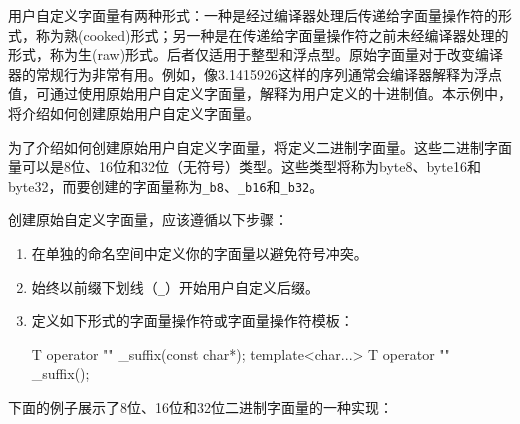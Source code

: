 

用户自定义字面量有两种形式：一种是经过编译器处理后传递给字面量操作符的形式，称为熟(cooked)形式；另一种是在传递给字面量操作符之前未经编译器处理的形式，称为生(raw)形式。后者仅适用于整型和浮点型。原始字面量对于改变编译器的常规行为非常有用。例如，像3.1415926这样的序列通常会编译器解释为浮点值，可通过使用原始用户自定义字面量，解释为用户定义的十进制值。本示例中，将介绍如何创建原始用户自定义字面量。


为了介绍如何创建原始用户自定义字面量，将定义二进制字面量。这些二进制字面量可以是8位、16位和32位（无符号）类型。这些类型将称为byte8、byte16和byte32，而要创建的字面量称为\verb|_b8|、\verb|_b16|和\verb|_b32|。


创建原始自定义字面量，应该遵循以下步骤：

\begin{enumerate}
\item
在单独的命名空间中定义你的字面量以避免符号冲突。

\item
始终以前缀下划线（\verb|_|）开始用户自定义后缀。

\item
定义如下形式的字面量操作符或字面量操作符模板：

\begin{cpp}
T operator "" _suffix(const char*);
template<char...> T operator "" _suffix();
\end{cpp}
\end{enumerate}

下面的例子展示了8位、16位和32位二进制字面量的一种实现：

